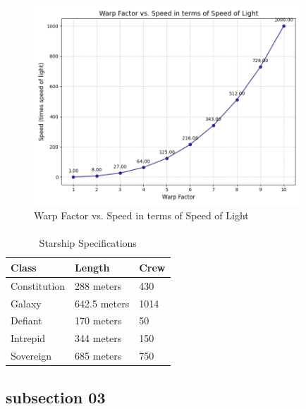 \documentclass[class=book, crop=false]{standalone}
\begin{document}
\begin{figure}[htbp]
    \centering
    \includegraphics[width=10cm]{src/contents/figures_and_plots/plots/warp_factor_vs_speed_of_light.png}
    \caption{Warp Factor vs. Speed in terms of Speed of Light}
    \label{fig:warp}
\end{figure}

\paragraph*{}
\blindtext

\begin{table}[htbp]
    \centering
    \caption{Starship Specifications}
    \label{tab:starship-specs}
    \begin{tabular}{@{}lll@{}} %
        \toprule
        \textbf{Class} & \textbf{Length} & \textbf{Crew} \\
        \midrule
        Constitution & 288 meters & 430 \\
        Galaxy & 642.5 meters & 1014 \\
        Defiant & 170 meters & 50 \\
        Intrepid & 344 meters & 150 \\
        Sovereign & 685 meters & 750 \\
        \bottomrule
    \end{tabular}
\end{table}

\subsection{subsection 03}

\paragraph*{}
\blindtext
\end{document}
